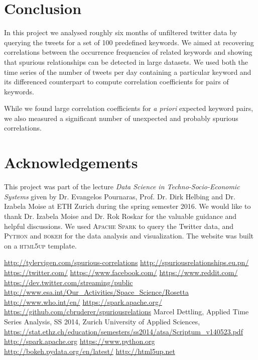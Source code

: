 \documentclass[12pt, a4paper]{article}
\begin{document}
\section{Conclusion}
In this project we analysed roughly six months of unfiltered twitter data by querying the tweets for a set of 100 predefined keywords. We aimed at recovering correlations between the occurrence frequencies of related keywords and showing that spurious relationships can be detected in large datasets. We used both the time series of the number of tweets per day containing a particular keyword and its differenced counterpart to compute correlation coefficients for pairs of keywords. 

While we found large correlation coefficients for \textit{a priori} expected keyword pairs, we also measured a significant number of unexpected and probably spurious correlations.


\section{Acknowledgements}
This project was part of the lecture \textit{Data Science in Techno-Socio-Economic Systems} given by Dr. Evangelos Pournaras, Prof. Dr. Dirk Helbing and Dr. Izabela Moise at ETH Zurich during the spring semester 2016. We would like to thank Dr. Izabela Moise and Dr. Rok Roskar for the valuable guidance and helpful discussions. We used \textsc{Apache Spark} \cite{spark}  to query the Twitter data, and \textsc{Python} \cite{python} and \textsc{bokeh} \cite{bokeh} for the data analysis and visualization. The website was built on a \textsc{html5up} \cite{html5up} template.

\begin{thebibliography}{9}

\url{http://tylervigen.com/spurious-correlations}
\url{http://spuriousrelationships.eu.pn/}
\url{https://twitter.com/}
\url{https://www.facebook.com/}
\url{https://www.reddit.com/}
\url{https://dev.twitter.com/streaming/public}
\url{http://www.esa.int/Our_Activities/Space_Science/Rosetta}
\url{http://www.who.int/en/}
\url{https://spark.apache.org/}
\url{https://github.com/cbruderer/spuriousrelations}
 Marcel Dettling, Applied Time Series Analysis, SS 2014, Zurich University of Applied Sciences, \url{https://stat.ethz.ch/education/semesters/ss2014/atsa/Scriptum_v140523.pdf}
\url{http://spark.apache.org}
\url{https://www.python.org}
\url{http://bokeh.pydata.org/en/latest/}
\url{http://html5up.net}

\end{thebibliography}
\end{document}
